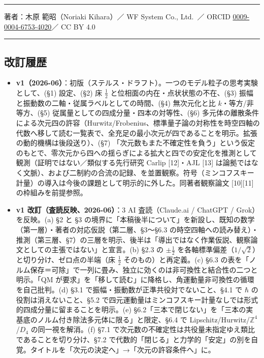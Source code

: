 \documentclass[
]{ltjsarticle}
\providecommand{\tightlist}{%
  \setlength{\itemsep}{0pt}\setlength{\parskip}{0pt}}
\begin{document}
\begin{center}\rule{0.5\linewidth}{0.5pt}\end{center}

著者：木原 範昭（Noriaki Kihara）／ WF System Co., Ltd.~／ ORCID
\href{https://orcid.org/0009-0004-6753-4020}{0009-0004-6753-4020}／ CC
BY 4.0

\begin{center}\rule{0.5\linewidth}{0.5pt}\end{center}

\subsection{改訂履歴}\label{ux6539ux8a02ux5c65ux6b74}

\begin{itemize}
\tightlist
\item
  \textbf{v1（2026-06）}：初版（ステルス・ドラフト）。一つのモデル粒子の思考実験として、(§1)
  設定、(§2) 床 \(\tfrac12\) と位相面の内在・点状状態の不在、(§3)
  振幅と振動数の二軸・従属ラベルとしての時間、(§4) 無次元化と比
  \(k\)・等方/非等方、(§5) 従属量としての四成分量・四本の対等性、(§6)
  多元体の離散条件による次元四の許容（Hurwitz/Frobenius、標準量子論の対称性を時空四軸の代数へ移して読む一覧表で、全充足の最小次元が四であることを明示。拡張の動的機構は後段送り）、(§7)
  「次元数もまた不確定性を負う」という仮定のもとで、零次元から四への揺らぎによる拡大と四での安定化を推測として観測（証明ではない／類似する先行研究
  Carlip {[}12{]}・AJL {[}13{]}
  は論拠ではなく文脈）、および二制約の合流の記録、を並置観察。符号（ミンコフスキー計量）の導入は今後の課題として明示的に外した。同著者観察論文
  {[}10{]}{[}11{]} の枠組みを前提参照。
\item
  \textbf{v1 改訂（査読反映、2026-06）}：3 AI 査読（Claude.ai / ChatGPT
  / Grok）を反映。(a) §2 と §3
  の境界に「本稿後半について」を新設し、既知の数学（第一層）・著者の対応仮説（第二層、§3〜§6.3
  の時空四軸への読み替え）・推測（第三層、§7）の三層を明示、後半は「導出ではなく作業仮説、観察論文としての主張ではない」と宣言。(b)
  §2.3 の \(\pm\tfrac12\)
  を各軸標準偏差（\(1/\sqrt2\)）と切り分け、ゼロ点の半端（床
  \(\tfrac12\) そのもの）と再定義。(c) §6.3
  の表を「ノルム保存＝可除」で一列に畳み、独立に効くのは非可換性と結合性の二つと明示。「QM
  が要求」を「移して読む」に降格し、角運動量非可換性の循環を自己批判。(d)
  §3.1 で振幅・振動数が正準共役対でないこと、§4.1 で \(\hbar\)
  の役割は消えないこと、§5.2
  で四元運動量はミンコフスキー計量なしでは形式的四成分量に留まることを明示。(e)
  §6.2「三本で閉じない」を「三本の実基底のノルム付き除法多元体に限る」と限定、§6.4
  で Lipschitz/Hurwitz/\(\mathbb{Z}^4\)/\(D_4\) の同一視を解消。(f) §7.1
  で次元数の不確定性は共役量未指定ゆえ類比であることを切り分け、§7.2
  で代数的「閉じる」と力学的「安定」の別を自覚。タイトルを「次元の決定へ」→「次元の許容条件へ」に。
\end{itemize}
\end{document}
